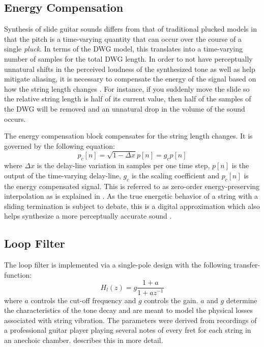 \documentclass[main.tex]{subfiles}
\begin{document}
\subsection{Energy Compensation}
Synthesis of slide guitar sounds differs from that of traditional plucked models in that the pitch is a time-varying quantity that can occur over the course of a single \emph{pluck}. In terms of the DWG model, this translates into a time-varying number of samples for the total DWG length. In order to not have perceptually unnatural shifts in the perceived loudness of the synthesized tone as well as help mitigate aliasing, it is necessary to compensate the energy of the signal based on how the string length changes . For instance, if you suddenly move the slide so the relative string length is half of its current value, then half of the samples of the DWG will be removed and an unnatural drop in the volume of the sound occurs.

The energy compensation block compensates for the string length changes. It is governed by the following equation:
\begin{equation}
    p_c[n] = \sqrt{1-\Delta x}p[n] = g_c p[n]
    \label{eq:energyScaler}
\end{equation}
where $\Delta x$ is the delay-line variation in samples per one time step, $p[n]$ is the output of the time-varying delay-line, $g_c$ is the scaling coefficient and $p_c[n]$ is the energy compensated signal. This is referred to as zero-order energy-preserving interpolation as is explained in . As the true energetic behavior of a string with a sliding termination is subject to debate, this is a digital approximation which also helps synthesize a more perceptually accurate sound .

\subsection{Loop Filter}
\label{sec:Ch2LoopFilter}
The loop filter is implemented via a single-pole design with the following transfer-function:
\begin{equation}
    H_l(z) = g \frac{1 + a}{1 + a z^{-1}}
    \label{eqn:one-pole}
\end{equation}
where $a$ controls the cut-off frequency and $g$ controls the gain. $a$ and $g$ determine the characteristics of the tone decay and are meant to model the physical losses associated with string vibration. The parameters were derived from recordings of a professional guitar player playing several notes of every fret for each string in an anechoic chamber.  describes this in more detail.
\end{document}
